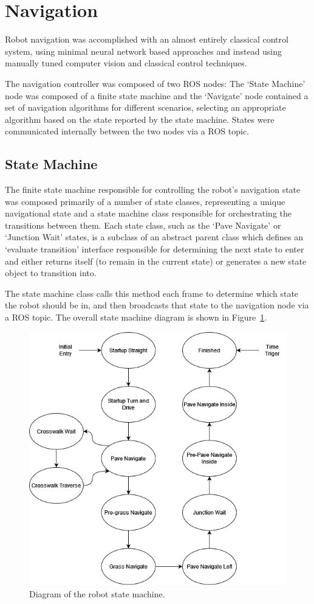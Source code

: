 \documentclass[titlepage, twocolumn]{article}
\begin{document}
\section{Navigation}
    Robot navigation was accomplished with an almost entirely classical control system, using minimal neural network based approaches and instead using manually tuned computer vision and classical control techniques. 

    The navigation controller was composed of two ROS nodes: The `State Machine' node was composed of a finite state machine and the `Navigate' node contained a set of navigation algorithms for different scenarios, selecting an appropriate algorithm based on the state reported by the state machine. States were communicated internally between the two nodes via a ROS topic.
    
    \subsection{State Machine}
        The finite state machine responsible for controlling the robot's navigation state was composed primarily of a number of state classes, representing a unique navigational state and a state machine class responsible for orchestrating the transitions between them. Each state class, such as the `Pave Navigate' or `Junction Wait' states, is a subclass of an abstract parent class which defines an `evaluate transition' interface responsible for determining the next state to enter and either returns itself (to remain in the current state) or generates a new state object to transition into. 
        
        The state machine class calls this method each frame to determine which state the robot should be in, and then broadcasts that state to the navigation node via a ROS topic. The overall state machine diagram is shown in Figure~\ref{fig:statemachine}.

        \begin{figure}
            \centering
            \includegraphics[width=0.8\linewidth]{statemachine.png}
            \caption{Diagram of the robot state machine.}
            \label{fig:statemachine}
        \end{figure}
\end{document}
